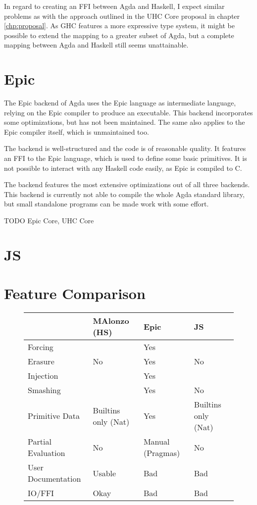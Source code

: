 \documentclass[12pt, a4paper, twoside]{report}
\begin{document}
In regard to creating an FFI between Agda and Haskell, I expect similar problems as with the approach
outlined in the UHC Core proposal in chapter \ref{chp:proposal}. As GHC features a more expressive type system,
it might be possible to extend the mapping to a greater subset of Agda, but a complete mapping
between Agda and Haskell still seems unattainable.
\section{Epic}
The Epic backend \cite{fredriksson2011totaly} of Agda uses the Epic language \cite{Brady:2011:ELG:2362963.2362968} as intermediate
language, relying on the Epic compiler to produce an executable. This backend incorporates some optimizations, but has not been
maintained. The same also applies to the Epic compiler itself, which is unmaintained too.

The backend is well-structured and the code is of reasonable quality. It features an FFI to the Epic language,
which is used to define some basic primitives. It is not possible to interact with any Haskell code easily,
as Epic is compiled to C.

The backend features the most extensive optimizations out of all three backends. This backend is currently not able
to compile the whole Agda standard library, but small standalone programs can be made work with some effort.


TODO Epic Core, UHC Core

\section{JS}

\section{Feature Comparison}
\begin{figure}
\begin{tabular}{l | l | l | l}
& MAlonzo (HS) & Epic & JS \\
\hline
Forcing & & Yes & \\
Erasure & No & Yes & No \\
Injection & & Yes & \\
Smashing & & Yes & No \\
Primitive Data & Builtins only (Nat) & Yes & Builtins only (Nat) \\
Partial Evaluation & No & Manual (Pragmas) & No \\
\hline
User Documentation & Usable & Bad & Bad \\
IO/FFI & Okay & Bad & Bad \\
\hline
\end{tabular}
\end{figure}
\end{document}
